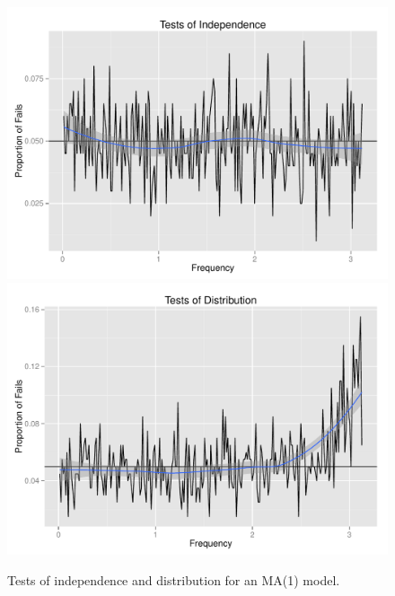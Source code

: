 \documentclass{article}\usepackage{graphicx, color}
\newenvironment{knitrout}{}{} %
\theoremstyle{plain}
\begin{document}
\begin{knitrout}
\color{fgcolor}\begin{figure}[H]

\includegraphics[width=.49\textwidth]{figure/tests-ma11} 
\includegraphics[width=.49\textwidth]{figure/tests-ma12} \caption[Tests of independence and distribution for an MA(1) model]{Tests of independence and distribution for an MA(1) model.\label{fig:tests-ma1}}
\end{figure}


\end{knitrout}
\end{document}
